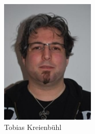 \begin{figure}[H]
	\includegraphics[width=0.4\textwidth]{./04_Projektmanagement/fig/tobiaskreienbuehl.jpg}
	\caption{Tobias Kreienbühl}
\end{figure}

